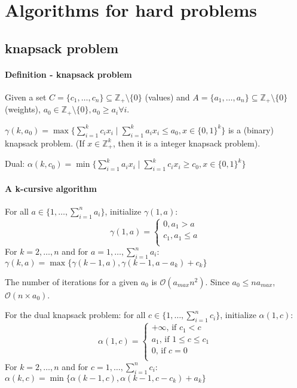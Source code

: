 \documentclass[main]{subfiles}
\begin{document}

\section{Algorithms for hard problems}

\subsection{knapsack problem}
\paragraph{Definition - knapsack problem}

Given a set $C = \{ c_{1}, \dots, c_{n} \} \subseteq \mathbb{Z}_{+} \setminus
\{ 0\}$ (values) and $A = \{a_{1}, \dots, a_{n}\} \subseteq \mathbb{Z}_{+}
\setminus \{ 0\}$ (weights), $a_{0} \in \mathbb{Z}_{+} \setminus \{ 0\},
a_{0} \geq a_{i} \forall i$.

$\gamma(k, a_{0}) = \max \{\sum_{i =1}^{k} c_{i} x_{i} \mid \sum_{i=1}^{k}
a_{i}x_{i} \leq a_{0}, x \in \{0,1\}^{k} \}$ is a (binary) knapsack problem.
(If $x \in \mathbb{Z}_{+}^{k}$, then it is a integer knapsack problem).

Dual:
$\alpha(k, c_{0}) = \min \{ \sum_{i =1}^{k} a_{i} x_{i} \mid \sum_{i=1}^{k}
c_{i}x_{i} \geq c_{0}, x \in \{0,1\}^{k} \}$

\paragraph{A k-cursive algorithm}
For all $a \in \{1, \dots, \sum_{i=1}^{n} a_i\}$, initialize $\gamma(1, a)$:
\[
  \gamma(1, a)=\begin{cases}
               0, a_{1} > a\\
               c_{1}, a_{1} \leq a\\
            \end{cases}
\]
For $k = 2, \dots, n$ and for $a = 1, \dots, \sum_{i=1}^{n} a_i$:
$\gamma(k, a) = \max \{\gamma(k-1, a), \gamma(k-1, a - a_k) + c_k \}$

The number of iterations for a given $a_{0}$ is $\mathcal{O}(a_{max} n^2)$.
Since $a_0 \leq n a_{max}$, $\mathcal{O}(n \times a_{0})$.

For the dual knapsack problem: for all $c \in \{1, \dots, \sum_{i=1}^{n} c_i
\}$, initialize $\alpha(1, c)$:
\[
  \alpha(1, c)=\begin{cases}
               +\infty \text{, if } c_{1} < c\\
               a_{1} \text{, if } 1 \leq c \leq c_1\\
               0 \text{, if } c = 0\\
            \end{cases}
\]
For $k = 2, \dots, n$ and for $c = 1, \dots, \sum_{i=1}^{n} c_i$:
$\alpha(k, c) = \min \{\alpha(k-1, c), \alpha(k-1, c - c_{k}) + a_{k}\}$
\end{document}
